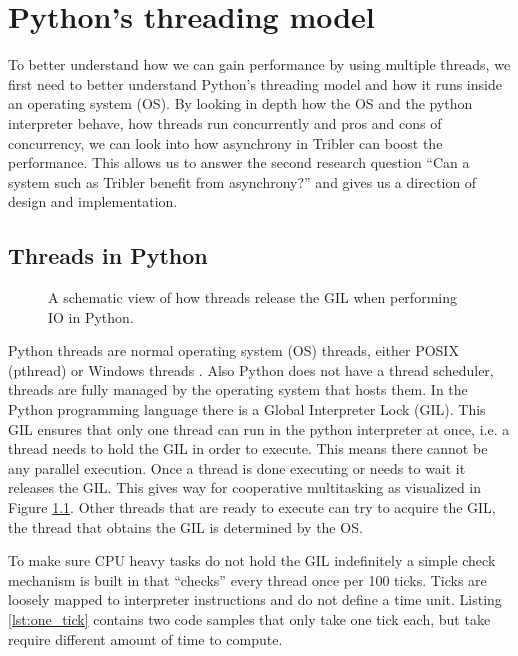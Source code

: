 \chapter{Python's threading model}
\label{cpt:pythons_thread_model}

To better understand how we can gain performance by using multiple threads, we first need to better understand Python's threading model and how it runs inside an operating system (OS).
By looking in depth how the OS and the python interpreter behave, how threads run concurrently and pros and cons of concurrency, we can look into how asynchrony in Tribler can boost the performance.
This allows us to answer the second research question \enquote{Can a system such as Tribler benefit from asynchrony?} and gives us a direction of design and implementation.

\section{Threads in Python}

\begin{figure}[!h]
	\caption{A schematic view of how threads release the GIL when performing IO in Python.}
	\label{fig:python_threads_release_gil}
\end{figure}

Python threads are normal operating system (OS) threads, either POSIX (pthread) or Windows threads \cite{beazley2010understanding, beazley2009inside}.
Also Python does not have a thread scheduler, threads are fully managed by the operating system that hosts them.
In the Python programming language there is a Global Interpreter Lock (GIL).
This GIL ensures that only one thread can run in the python interpreter at once, i.e. a thread needs to hold the GIL in order to execute.
This means there cannot be any parallel execution.
Once a thread is done executing or needs to wait it releases the GIL.
This gives way for cooperative multitasking as visualized in Figure \ref{fig:python_threads_release_gil}.
Other threads that are ready to execute can try to acquire the GIL, the thread that obtains the GIL is determined by the OS.

To make sure CPU heavy tasks do not hold the GIL indefinitely a simple check mechanism is built in that ``checks'' every thread once per 100 ticks.
Ticks are loosely mapped to interpreter instructions and do not define a time unit.
Listing \ref{lst:one_tick} contains two code samples that only take one tick each, but take require different amount of time to compute.

